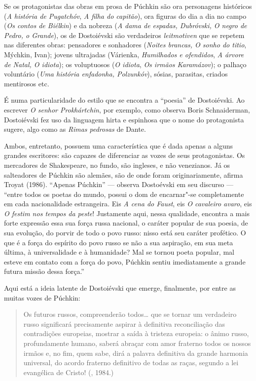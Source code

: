 Se os protagonistas das obras em prosa de Púchkin são ora personagens
históricos (\emph{A história de Pugatchóv}, \emph{A filha do capitão}),
ora figuras do dia a dia no campo (\emph{Os contos de Biélkin}) e da
nobreza (\emph{A dama de espadas, Dubróvski, O negro de Pedro, o
Grande}), os de Dostoiévski são verdadeiros \emph{leitmotiven}
que se repetem nas diferentes obras: pensadores e sonhadores
(\emph{Noites brancas, O sonho do titio}, Mýchkin, Ivan); jovens ultrajadas (Várienka, \emph{Humilhados e ofendidos}, \emph{A árvore de Natal, O idiota}); os voluptuosos (\emph{O idiota}, \emph{Os irmãos Karamázov}); o palhaço
voluntário (\emph{Uma história enfadonha, Polzunkóv}), sósias,
parasitas, criados mentirosos etc.

É numa particularidade do estilo que se encontra a ``poesia'' de Dostoiévski. Ao escrever \emph{O senhor Prokhártchin}, por exemplo, como observa Boris Schnaiderman, Dostoiévski fez uso da linguagem hirta e espinhosa que o nome do protagonista sugere, algo como as \emph{Rimas pedrosas} de Dante.

Ambos, entretanto, possuem uma característica que é dada apenas
a alguns grandes escritores: são capazes de diferenciar as vozes
de seus protagonistas. Os mercadores de Shakespeare, no fundo,
são ingleses, e não venezianos. Já os salteadores de Púchkin são
alemães, são de onde foram originariamente, afirma Troyat (1986).
``Apenas Púchkin'' --- observa Dostoévski em seu discurso ---
``entre todos os poetas do mundo, possui o dom de encarnar"-se
completamente em cada nacionalidade estrangeira. Eis \emph{A
cena do Faust}, eis \emph{O cavaleiro avaro}, eis \emph{O festim
nos tempos da peste}! Justamente aqui, nessa qualidade, encontra
a mais forte expressão essa sua força russa nacional, o caráter
popular de sua poesia, de sua evolução, do porvir de todo o povo
russo: nisso está seu caráter profético. O que é a força do espírito do povo russo se não a sua aspiração, em sua meta última, à universalidade e à humanidade? Mal se tornou poeta popular, mal esteve em contato com a força do povo, Púchkin sentiu imediatamente a grande futura missão dessa força.''

Aqui está a ideia latente de Dostoiévski que emerge, finalmente, por
entre as muitas vozes de Púchkin:

\begin{quote}
Os futuros russos, compreenderão todos\ldots{} que se tornar um verdadeiro russo significará precisamente aspirar à definitiva reconciliação das contradições europeias, mostrar a saída à tristeza europeia: o ânimo russo, profundamente humano, saberá abraçar com amor fraterno todos os nossos irmãos e, no fim, quem sabe, dirá a palavra definitiva da grande harmonia universal, do acordo fraterno definitivo de todas as raças, segundo a lei evangélica de Cristo! (, 1984.)
\end{quote}

